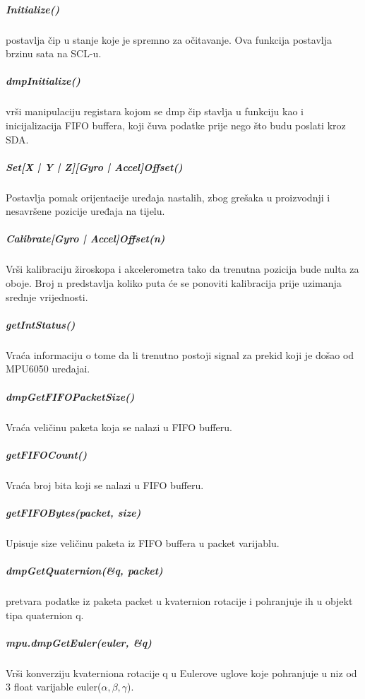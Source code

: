 \documentclass[../Document.tex]{subfiles}
\begin{document}
\subparagraph{Initialize()} \noindent postavlja čip u stanje koje je spremno za očitavanje. Ova funkcija postavlja brzinu sata na SCL-u.

\subparagraph{dmpInitialize()} \noindent vrši manipulaciju registara kojom se dmp čip stavlja u funkciju kao i inicijalizacija FIFO buffera, koji čuva podatke prije nego što budu poslati kroz SDA.

\subparagraph{Set[X | Y | Z][Gyro | Accel]Offset()} \noindent Postavlja pomak orijentacije uređaja nastalih, zbog grešaka u proizvodnji i nesavršene pozicije uređaja na tijelu.

\subparagraph{Calibrate[Gyro | Accel]Offset(n)} \noindent Vrši kalibraciju žiroskopa i akcelerometra tako da trenutna pozicija bude nulta za oboje. Broj n predstavlja koliko puta će se ponoviti kalibracija prije uzimanja srednje vrijednosti.

\subparagraph{getIntStatus()} \noindent Vraća informaciju o tome da li trenutno postoji signal za prekid koji je došao od MPU6050 uređajai.

\subparagraph{dmpGetFIFOPacketSize()} \noindent Vraća veličinu paketa koja se nalazi u FIFO bufferu.

\subparagraph{getFIFOCount()} \noindent Vraća broj bita koji se nalazi u FIFO bufferu.

\subparagraph{getFIFOBytes(packet, size)} \noindent Upisuje size veličinu paketa iz FIFO buffera u packet varijablu.

\subparagraph{dmpGetQuaternion(\&q, packet)} \noindent pretvara podatke iz paketa packet u kvaternion rotacije i pohranjuje ih u objekt tipa quaternion q.

\subparagraph{mpu.dmpGetEuler(euler, \&q)} \noindent Vrši konverziju kvaterniona rotacije q u Eulerove uglove koje pohranjuje u niz od 3 float varijable euler($\alpha,\beta,\gamma$).
\end{document}
